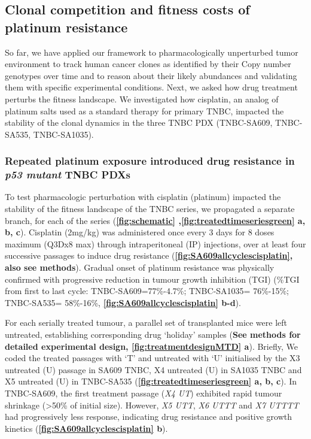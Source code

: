 \subsection{Clonal competition and fitness costs of platinum resistance}
So far, we have applied our framework to pharmacologically unperturbed tumor environment to track human cancer clones as identified by their Copy number genotypes over time and to reason about their likely abundances and validating them with specific experimental conditions. Next, we asked how drug treatment perturbs the fitness landscape. We investigated how cisplatin, an analog of platinum salts used as a standard therapy for primary TNBC, impacted the stability of the clonal dynamics in the three TNBC PDX (TNBC-SA609, TNBC-SA535, TNBC-SA1035).


\subsubsection{Repeated platinum exposure introduced drug resistance in \textit{p53 mutant} TNBC PDXs} 
 To test pharmacologic perturbation with cisplatin (platinum) impacted the stability of the fitness landscape of the TNBC series, we propagated a separate branch, for each of the series (\textbf{\autoref{fig:schematic} ,\autoref{fig:treatedtimeseriesgreen} a, b, c}). Cisplatin (2mg/kg) was administered once every 3 days for 8 doses maximum (Q3Dx8 max) through intraperitoneal (IP) injections, over at least four successive passages to induce drug resistance  (\textbf{\autoref{fig:SA609allcyclescisplatin}, also see methods}). Gradual onset of platinum resistance was physically confirmed with progressive reduction in tumour growth inhibition (TGI) \cite{hather2014growth} (\%TGI from first to last cycle: TNBC-SA609=77\%-4.7\%; TNBC-SA1035= 76\%-15\%; TNBC-SA535= 58\%-16\%, \textbf{\autoref{fig:SA609allcyclescisplatin} b-d}).
 
 For each serially treated tumour, a parallel set of transplanted mice were left untreated, establishing corresponding drug `holiday' samples (\textbf{See methods for detailed experimental design, \textbf{\autoref{fig:treatmentdesignMTD} a}}). Briefly, We coded the treated passages with `T' and untreated with `U' initialised by the X3 untreated (U) passage in SA609 TNBC, X4 untreated (U) in SA1035 TNBC and X5 untreated (U) in  TNBC-SA535 (\textbf{\autoref{fig:treatedtimeseriesgreen} a, b, c}). In TNBC-SA609, the first treatment passage (\textit{X4 UT}) exhibited rapid tumour shrinkage (>50\% of initial size). However, \textit{X5 UTT}, \textit{X6 UTTT} and \textit{X7 UTTTT} had progressively less response, indicating drug resistance and positive growth kinetics (\textbf{\autoref{fig:SA609allcyclescisplatin} b}).


